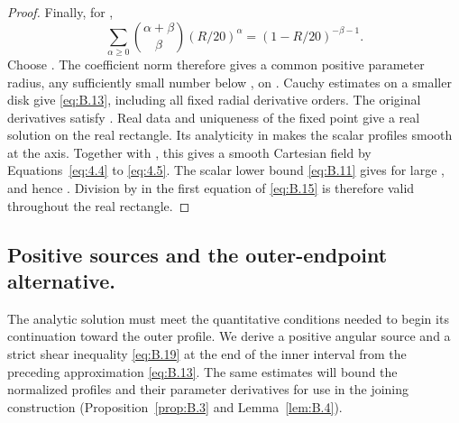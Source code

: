 \begin{proof}
Finally, for ,
\begin{equation*}
  \sum_{\alpha\geq0}\binom{\alpha+\beta}{\beta}(R/20)^\alpha
  =(1-R/20)^{-\beta-1}.
\end{equation*}
Choose . The coefficient norm therefore gives a common positive
parameter radius, any sufficiently small number below
, on . Cauchy estimates on a
smaller  disk give \eqref{eq:B.13}, including all fixed radial derivative
orders. The original derivatives satisfy
. Real data and uniqueness of the fixed
point give a real solution on the real rectangle. Its analyticity in  makes
the scalar profiles smooth at the axis. Together with
, this gives a smooth Cartesian field by
Equations~\eqref{eq:4.4} to \eqref{eq:4.5}. The scalar lower bound \eqref{eq:B.11} gives
 for large , and hence
. Division by  in the first equation of
\eqref{eq:B.15} is therefore valid throughout the real rectangle.
\end{proof}

\subsection{Positive sources and the outer-endpoint alternative.}\label{sec:B.4}
The analytic solution must meet the quantitative conditions needed to begin its continuation toward
the outer profile. We derive a positive angular source  and a strict shear
inequality \eqref{eq:B.19} at the end of the inner interval from the preceding approximation
\eqref{eq:B.13}. The same estimates will bound the normalized profiles and their parameter
derivatives for use in the joining construction (Proposition~\ref{prop:B.3} and
Lemma~\ref{lem:B.4}).

